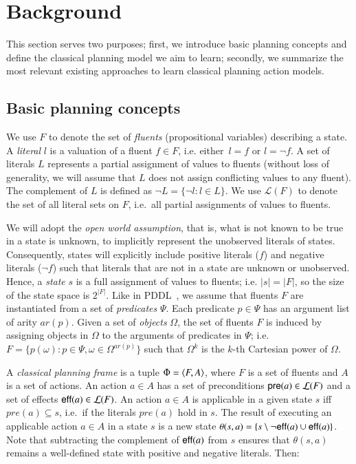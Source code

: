 
\section{Background}
\label{sec:background}

This section serves two purposes; first, we introduce basic planning concepts and define the classical planning model we aim to learn; secondly, we summarize the most relevant existing approaches to learn classical planning action models.



\subsection{Basic planning concepts}
\label{basic_planning}


We use $F$ to denote the set of {\em fluents} (propositional variables) describing a state. A {\em literal} $l$ is a valuation of a fluent $f\in F$, i.e. either~$l=f$ or $l=\neg f$. A set of literals $L$ represents a partial assignment of values to fluents (without loss of generality, we will assume that $L$ does not assign conflicting values to any fluent). The complement of $L$ is defined as $\neg L=\{\neg l:l\in L\}$. We use $\mathcal{L}(F)$ to denote the set of all literal sets on $F$, i.e.~all partial assignments of values to fluents.

We will adopt the \emph{open world assumption}, that is, what is not known to be true in a state is unknown, to implicitly represent the unobserved literals of states. Consequently, states will explicitly include positive literals ($f$) and negative literals ($\neg f$) such that literals that are not in a state are unknown or unobserved. Hence, a {\em state} $s$ is a full assignment of values to fluents; i.e. $|s|=|F|$, so the size of the state space is $2^{|F|}$. Like in PDDL~\cite{fox2003pddl2}, we assume that fluents $F$ are instantiated from a set of {\em predicates} $\Psi$. Each predicate $p\in\Psi$ has an argument list of arity $ar(p)$. Given a set of {\em objects} $\Omega$, the set of fluents $F$ is induced by assigning objects in $\Omega$ to the arguments of predicates in $\Psi$; i.e.~$F=\{p(\omega):p\in\Psi,\omega\in\Omega^{ar(p)}\}$ such that $\Omega^k$ is the $k$-th Cartesian power of $\Omega$.

A {\em classical planning frame} is a tuple $\Phi={\langle F,A \rangle}$, where $F$ is a set of fluents and $A$ is a set of actions. An action $a\in A$ has a set of preconditions $\mathsf{pre}(a)\in\mathcal{L}(F)$ and a set of effects $\mathsf{eff}(a)\in\mathcal{L}(F)$. An action $a\in A$ is applicable in a given state $s$ iff $pre(a)\subseteq s$, i.e.~if the literals $pre(a)$ hold in $s$. The result of executing an applicable action $a\in A$ in a state $s$ is a new state $\theta(s,a)=\{s\setminus \neg\mathsf{eff}(a)\cup\mathsf{eff}(a)\}$. Note that subtracting the complement of $\mathsf{eff}(a)$ from $s$ ensures that $\theta(s,a)$ remains a well-defined state with positive and negative literals. Then:

